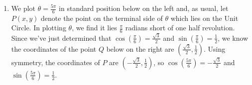 \documentclass{ximera}
\begin{document}
\begin{example}
\begin{explanation}
\begin{enumerate}
\begin{image}

\end{image}


\item  We plot $\theta = \frac{5\pi}{6}$ in standard position below on the left  and, as usual, let $P(x,y)$ denote the point on the terminal side of $\theta$ which lies on the Unit Circle.  In plotting $\theta$, we find it lies $\frac{\pi}{6}$ radians short of one half revolution. Since we've just determined that $\cos\left(\frac{\pi}{6}\right) = \frac{\sqrt{3}}{2}$ and $\sin\left( \frac{\pi}{6} \right) = \frac{1}{2}$, we know  the coordinates of the point $Q$ below on the right are $\left(\frac{\sqrt{3}}{2}, \frac{1}{2}\right)$.  Using symmetry, the coordinates of $P$ are $\left(-\frac{\sqrt{3}}{2}, \frac{1}{2}\right)$, so $\cos\left(\frac{5\pi}{6}\right) = -\frac{\sqrt{3}}{2}$ and $\sin\left( \frac{5\pi}{6} \right) = \frac{1}{2}$.


\begin{image}
\end{image}
\end{enumerate}
\end{explanation}
\end{example}
\end{document}
